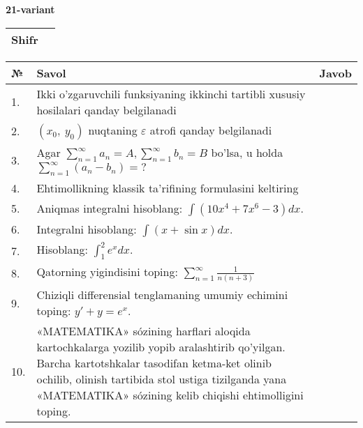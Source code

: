 \documentclass{article}
\begin{document}
  \egroup
  
  \newpage
  
  
  \textbf{21-variant}\\
  
  \bgroup
  \def\arraystretch{1.6} %
  
  \begin{tabular}{|m{5.7cm}|m{9.5cm}|}
  \hline
  Shifr & \\
  \hline
  \end{tabular}
  
  \vspace{1cm}
  
  \begin{tabular}{|m{0.7cm}|m{10cm}|m{4cm}|}
  \hline
  № & Savol & Javob \\
  \hline
  1. & Ikki o'zgaruvchili funksiyaning ikkinchi tartibli xususiy hosilalari qanday belgilanadi &  \\
  \hline
  2. & \((x_{0},\ y_{0})\) nuqtaning \(\varepsilon\) atrofi qanday belgilanadi &  \\
  \hline
  3. & Agar \(\sum_{n = 1}^{\infty}a_{n} = A,\sum_{n = 1}^{\infty}b_{n} = B\) bo'lsa, u holda \(\sum_{n = 1}^{\infty}\left( a_{n} - b_{n} \right) = ?\) &  \\
  \hline
  4. & Ehtimollikning klassik ta'rifining formulasini keltiring &  \\
  \hline
  5. & Aniqmas integralni hisoblang: \(\int {\left( 10x^{4} + 7x^{6} - 3 \right)dx}\). &  \\
  \hline
  6. & Integralni hisoblang: \(\int {(x + \sin x)dx}\). &  \\
  \hline
  7. & Hisoblang: \(\int_{1}^{2}{e^{x}dx}\). &  \\
  \hline
  8. & Qatorning yigindisini toping: \(\sum_{n = 1}^{\infty}\frac{1}{n(n + 3)}\) &  \\
  \hline
  9. & Chiziqli differensial tenglamaning umumiy echimini toping: \(y' + y = e^{x}\). &  \\
  \hline
  10. & «MATEMATIKA» sózining harflari aloqida kartochkalarga yozilib yopib aralashtirib qo'yilgan. Barcha kartotshkalar tasodifan ketma-ket olinib ochilib, olinish tartibida stol ustiga tizilganda yana «MATEMATIKA» sózining kelib chiqishi ehtimolligini toping. &  \\
  \hline
  \end{tabular}
  
  \vspace{1cm}
  
\end{document}
